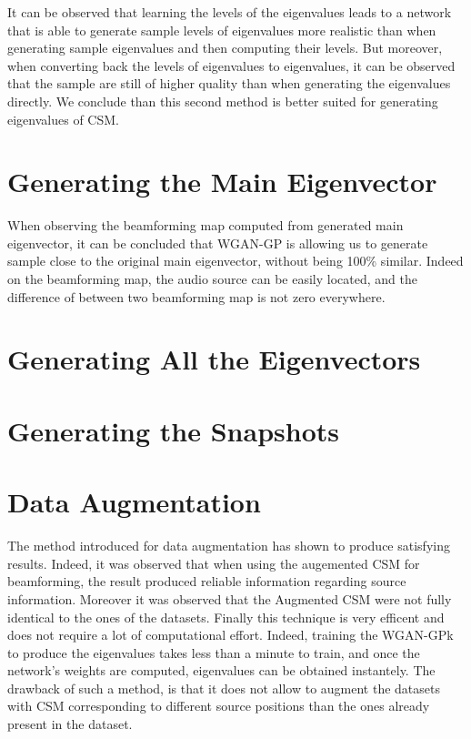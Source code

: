 \documentclass[11pt,a4paper,twoside]{report}
\begin{document}
It can be observed that learning the levels of the eigenvalues leads to a network that is able to generate sample levels of eigenvalues more realistic than when generating sample eigenvalues and then computing their levels. But moreover, when converting back the levels of eigenvalues to eigenvalues, it can be observed that the sample are still of higher quality than when generating the eigenvalues directly. We conclude than this second method is better suited for generating eigenvalues of CSM.

\section{Generating the Main Eigenvector}

When observing the beamforming map computed from generated main eigenvector, it can be concluded that WGAN-GP is allowing us to generate sample close to the original main eigenvector, without being 100\% similar. Indeed on the beamforming map, the audio source can be easily located, and the difference of between two beamforming map is not zero everywhere.

\section{Generating All the Eigenvectors}

\section{Generating the Snapshots}

\section{Data Augmentation}

The method introduced for data augmentation has shown to produce satisfying results. Indeed, it was observed that when using the augemented CSM for beamforming, the result produced reliable information regarding source information. Moreover it was observed that the Augmented CSM were not fully identical to the ones of the datasets. Finally this technique is very efficent and does not require a lot of computational effort. Indeed, training the WGAN-GPk to produce  the eigenvalues takes less than a minute to train, and once the network's weights are computed, eigenvalues can be obtained instantely. The drawback of such a method, is that it does not allow to augment the datasets with CSM corresponding to different source positions than the ones already present in the dataset.
\end{document}
